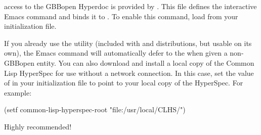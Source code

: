 \documentclass[10pt,twoside,english,pdftex]{article}
\begin{document}
%
 access to the
GBBopen Hyperdoc is provided by
.  This file defines
the interactive Emacs command  and binds it to
.  To enable this command, load  from
your  initialization file.

If you already use the
utility (included with
 and
distributions, but usable on its own), the Emacs
 command will automatically defer to the
 when
given a non-GBBopen entity.  You can also download and install a local copy of the 
Common Lisp HyperSpec for use without a network connection.  In this case, set the value of  in your  initialization file to point to your local copy of the HyperSpec.  For example:

\begin{example}
  (setf common-lisp-hyperspec-root "file:/usr/local/CLHS/")
\end{example}

Highly recommended!


\W\entities
\T\clearpage
\T\renewcommand{\headrulewidth}{0.01pt}

\end{document}
